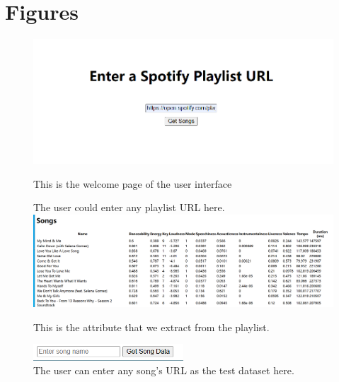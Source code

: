 \documentclass[titlepage]{article}
\begin{document}
\section{Figures}
\begin{figure}[!h]
\centering
\includegraphics[width=1\textwidth]{1.png}
\caption{This is the welcome page of the user interface}
The user could enter any playlist URL here.
\label{fig:enter-label}
\includegraphics[width=1\textwidth]{2.png}
\caption{This is the attribute that we extract from the playlist.}
\includegraphics[width=0.5\textwidth]{3.png}
\caption{The user can enter any song's URL as the test dataset here.}
\end{figure}
\end{document}
